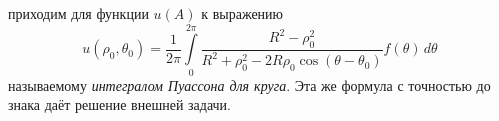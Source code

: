 
приходим для функции $u(A)$ к выражению 
\begin{equation}
	u(\rho_0, \theta_0) = \frac{1}{2 \pi} \int\limits_0^{2 \pi} \frac{R^2 - \rho_0^2}{R^2 + \rho_0^2 - 2 R \rho_0 \cos (\theta - \theta_0)} f(\theta) \, d \theta
	\label{equ:equSourceFunctionCircle}
\end{equation}
называемому \textit{интегралом Пуассона для круга}. Эта же формула с точностью до знака даёт решение внешней задачи.
